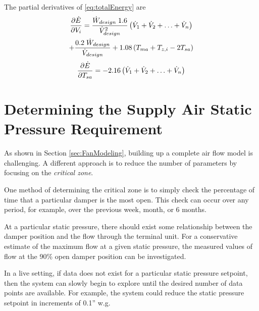 The partial derivatives of \ref{eq:totalEnergy} are 
\begin{multline}
\pdv{\dot{E}}{V_i}=\frac{\dot{W}_{design}\;1.6}{\dot{V}_{design}^2} \left(\dot{V}_{1}+\dot{V}_{2}+\ldots+\dot{V}_{n} \right)\\ 
+\frac{0.2\;\dot{W}_{design}}{\dot{V}_{design}}+ 1.08\left(T_{ma}+T_{z,i} -2T_{sa}\right)
\end{multline}
\begin{equation}
\pdv{\dot{E}}{T_{sa}}=-2.16\left(\dot{V}_{1}+\dot{V}_{2}+\ldots+\dot{V}_{n} \right)
\end{equation}


\section{Determining the Supply Air Static Pressure Requirement}

As shown in Section \ref{sec:FanModeling}, building up a complete air flow model is challenging. A different approach is to reduce the number of parameters by focusing on the \textit{critical zone}. 

One method of determining the critical zone is to simply check the percentage of time that a particular damper is the most open. This check can occur over any period, for example, over the previous week, month, or 6 months.

At a particular static pressure, there should exist some relationship between the damper position and the flow through the terminal unit. For a conservative estimate of the maximum flow at a given static pressure, the measured values of flow at the 90\% open damper position can be investigated. 

In a live setting, if data does not exist for a particular static pressure setpoint, then the system can slowly begin to explore until the desired number of data points are available. For example, the system could reduce the static pressure setpoint in increments of 0.1'' w.g. 




%
%
%
%
%
%
%
%



























